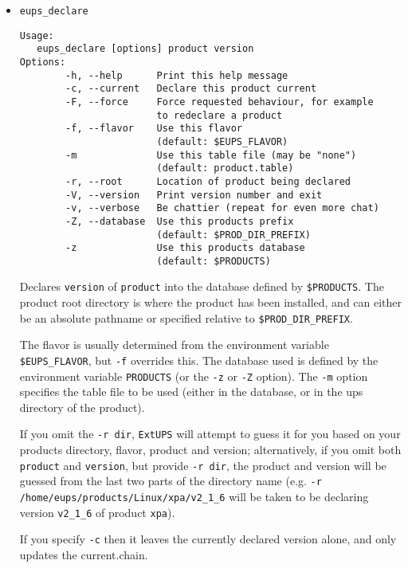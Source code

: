 \documentclass{article}
\newcommand{\code}[1]{\texttt{#1}}
\newcommand{\eups}{\code{ExtUPS}}
\begin{document}
\begin{itemize}


\item \texttt{eups\_declare}
\begin{verbatim}
Usage:
   eups_declare [options] product version
Options:
        -h, --help      Print this help message
        -c, --current   Declare this product current
        -F, --force     Force requested behaviour, for example
                        to redeclare a product
        -f, --flavor    Use this flavor
                        (default: $EUPS_FLAVOR)
        -m              Use this table file (may be "none")
                        (default: product.table)
        -r, --root      Location of product being declared
        -V, --version   Print version number and exit
        -v, --verbose   Be chattier (repeat for even more chat)
        -Z, --database  Use this products prefix
                        (default: $PROD_DIR_PREFIX)
        -z              Use this products database
                        (default: $PRODUCTS)
\end{verbatim}

Declares \texttt{version} of \texttt{product} into the database defined by \texttt{\$PRODUCTS}.
The product root directory is where the product has been installed, and can either
be an absolute pathname or specified relative to \texttt{\$PROD\_DIR\_PREFIX}.

The flavor is usually determined from the
environment variable \texttt{\$EUPS\_FLAVOR}, but \texttt{-f}
overrides this. The database used is defined by the environment
variable \texttt{PRODUCTS} (or the \texttt{-z} or \texttt{-Z} option).
The \texttt{-m} option specifies the table
file to be used (either in the database, or in the ups directory of the product).

If you omit the \texttt{-r dir}, \eups{} will attempt to guess it for you based
on your products directory, flavor, product and version; alternatively,
if you omit both \texttt{product} and \texttt{version}, but provide \texttt{-r dir},
the product and version will be guessed from the last two parts of the directory
name (e.g. \texttt{-r /home/eups/products/Linux/xpa/v2\_1\_6} will be taken to be
declaring version \texttt{v2\_1\_6} of product \texttt{xpa}).

If you specify \texttt{-c} then it leaves the currently declared version alone, and
only updates the current.chain.


\end{itemize}
\end{document}
